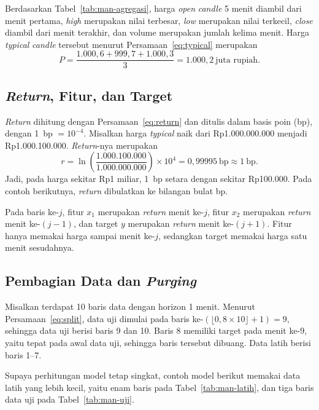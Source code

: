 Berdasarkan Tabel~\ref{tab:man-agregasi}, harga \textit{open} \textit{candle}
5 menit diambil dari menit pertama, \textit{high} merupakan nilai terbesar,
\textit{low} merupakan nilai terkecil, \textit{close} diambil dari menit
terakhir, dan volume merupakan jumlah kelima menit. Harga \textit{typical}
\textit{candle} tersebut menurut Persamaan~\eqref{eq:typical} merupakan
\begin{equation*}
  P = \frac{1.000{,}6 + 999{,}7 + 1.000{,}3}{3} = 1.000{,}2~\text{juta rupiah}.
\end{equation*}

\subsection{\textit{Return}, Fitur, dan Target}
\textit{Return} dihitung dengan Persamaan~\eqref{eq:return} dan ditulis dalam
basis poin (bp), dengan 1~bp $= 10^{-4}$. Misalkan harga \textit{typical} naik
dari Rp1.000.000.000 menjadi Rp1.000.100.000. \textit{Return}-nya merupakan
\begin{equation*}
  r = \ln\!\left(\frac{1.000.100.000}{1.000.000.000}\right) \times 10^{4}
    = 0{,}99995~\text{bp} \approx 1~\text{bp}.
\end{equation*}
Jadi, pada harga sekitar Rp1 miliar, 1~bp setara dengan sekitar Rp100.000.
Pada contoh berikutnya, \textit{return} dibulatkan ke bilangan bulat bp.

Pada baris ke-$j$, fitur $x_1$ merupakan \textit{return} menit ke-$j$, fitur
$x_2$ merupakan \textit{return} menit ke-$(j-1)$, dan target $y$ merupakan
\textit{return} menit ke-$(j+1)$. Fitur hanya memakai harga sampai menit
ke-$j$, sedangkan target memakai harga satu menit sesudahnya.

\subsection{Pembagian Data dan \textit{Purging}}
Misalkan terdapat 10 baris data dengan horizon 1 menit. Menurut
Persamaan~\eqref{eq:split}, data uji dimulai pada baris ke-$(\lfloor 0{,}8
\times 10 \rfloor + 1) = 9$, sehingga data uji berisi baris 9 dan 10. Baris 8
memiliki target pada menit ke-9, yaitu tepat pada awal data uji, sehingga
baris tersebut dibuang. Data latih berisi baris 1--7.

Supaya perhitungan model tetap singkat, contoh model berikut memakai data latih
yang lebih kecil, yaitu enam baris pada Tabel~\ref{tab:man-latih}, dan tiga
baris data uji pada Tabel~\ref{tab:man-uji}.

